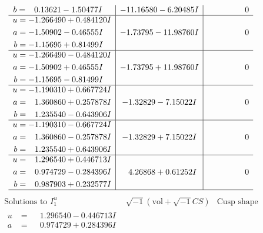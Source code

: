 \documentclass[1p]{elsarticle_modified}
\theoremstyle{definition}
\newcommand{\I}{\sqrt{-1}}
\begin{document}
$$\begin{array}{c|c|c}
\begin{aligned}
b &= \phantom{-}0.13621 - 1.50477 I\end{aligned}
 & -11.16580 - 6.20485 I & \phantom{-0.000000 } 0 \\ \hline\begin{aligned}
u &= -1.266490 + 0.484120 I \\
a &= -1.50902 - 0.46555 I \\
b &= -1.15695 + 0.81499 I\end{aligned}
 & -1.73795 - 11.98760 I & \phantom{-0.000000 } 0 \\ \hline\begin{aligned}
u &= -1.266490 - 0.484120 I \\
a &= -1.50902 + 0.46555 I \\
b &= -1.15695 - 0.81499 I\end{aligned}
 & -1.73795 + 11.98760 I & \phantom{-0.000000 } 0 \\ \hline\begin{aligned}
u &= -1.190310 + 0.667724 I \\
a &= \phantom{-}1.360860 + 0.257878 I \\
b &= \phantom{-}1.235540 - 0.643906 I\end{aligned}
 & -1.32829 - 7.15022 I & \phantom{-0.000000 } 0 \\ \hline\begin{aligned}
u &= -1.190310 - 0.667724 I \\
a &= \phantom{-}1.360860 - 0.257878 I \\
b &= \phantom{-}1.235540 + 0.643906 I\end{aligned}
 & -1.32829 + 7.15022 I & \phantom{-0.000000 } 0 \\ \hline\begin{aligned}
u &= \phantom{-}1.296540 + 0.446713 I \\
a &= \phantom{-}0.974729 - 0.284396 I \\
b &= \phantom{-}0.987903 + 0.232577 I\end{aligned}
 & \phantom{-}4.26868 + 0.61252 I & \phantom{-0.000000 } 0\\
 \hline 
 \end{array}$$\newpage$$\begin{array}{c|c|c}  
\text{Solutions to }I^u_{1}& \I (\text{vol} + \sqrt{-1}CS) & \text{Cusp shape}\\
 \hline 
\begin{aligned}
u &= \phantom{-}1.296540 - 0.446713 I \\
a &= \phantom{-}0.974729 + 0.284396 I \\

\end{aligned}
\end{array}$$
\end{document}
